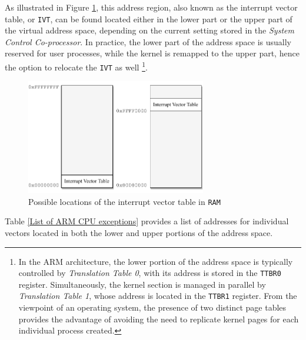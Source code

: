 \documentclass[english, ing, kiv, he, iso690numb, pdf]{fasthesis}
\begin{document}
	As illustrated in Figure \ref{Possible locations of the interrupt vector table in RAM}, this address region, also known as the interrupt vector table, or \texttt{IVT}, can be found located either in the lower part or the upper part of the virtual address space, depending on the current setting stored in the \textit{System Control Co-processor}. In practice, the lower part of the address space is usually reserved for user processes, while the kernel is remapped to the upper part, hence the option to relocate the \texttt{IVT} as well \footnote{In the ARM architecture, the lower portion of the address space is typically controlled by \textit{Translation Table 0}, with its address is stored in the \texttt{TTBR0} register. Simultaneously, the kernel section is managed in parallel by \textit{Translation Table 1}, whose address is located in the \texttt{TTBR1} register. From the viewpoint of an operating system, the presence of two distinct page tables provides the advantage of avoiding the need to replicate kernel pages for each individual process created.}.
	
	\begin{figure}[ht]
		\centering
		\includegraphics[width=0.7\textwidth]{img/diagrams/ivt_location.pdf}
		\caption{Possible locations of the interrupt vector table in \texttt{RAM}}
		\label{Possible locations of the interrupt vector table in RAM}
	\end{figure}
	
	Table \ref{List of ARM CPU exceptions} provides a list of addresses for individual vectors located in both the lower and upper portions of the address space.
	
	\newpage
	
\end{document}
